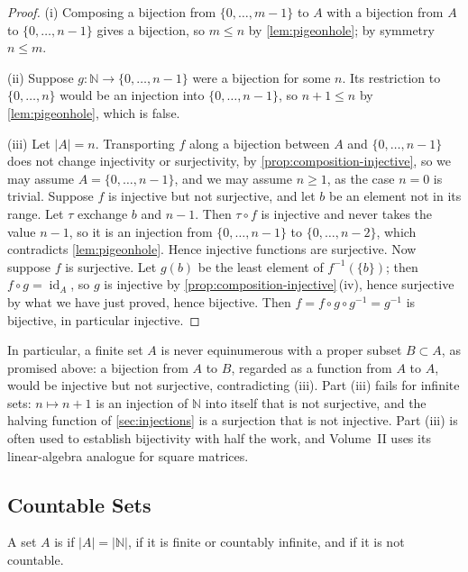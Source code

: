 \begin{proof}
(i) Composing a bijection from $\{0,\ldots,m-1\}$ to $A$ with a bijection from $A$ to $\{0,\ldots,n-1\}$ gives a bijection, so $m\le n$ by \cref{lem:pigeonhole}; by symmetry $n\le m$.

(ii) Suppose $g\colon\mathbb N\to\{0,\ldots,n-1\}$ were a bijection for some $n$. Its restriction to $\{0,\ldots,n\}$ would be an injection into $\{0,\ldots,n-1\}$, so $n+1\le n$ by \cref{lem:pigeonhole}, which is false.

(iii) Let $|A|=n$. Transporting $f$ along a bijection between $A$ and $\{0,\ldots,n-1\}$ does not change injectivity or surjectivity, by \cref{prop:composition-injective}, so we may assume $A=\{0,\ldots,n-1\}$, and we may assume $n\ge1$, as the case $n=0$ is trivial. Suppose $f$ is injective but not surjective, and let $b$ be an element not in its range. Let $\tau$ exchange $b$ and $n-1$. Then $\tau\circ f$ is injective and never takes the value $n-1$, so it is an injection from $\{0,\ldots,n-1\}$ to $\{0,\ldots,n-2\}$, which contradicts \cref{lem:pigeonhole}. Hence injective functions are surjective. Now suppose $f$ is surjective. Let $g(b)$ be the least element of $f^{-1}(\{b\})$; then $f\circ g=\operatorname{id}_A$, so $g$ is injective by \cref{prop:composition-injective}\,(iv), hence surjective by what we have just proved, hence bijective. Then $f=f\circ g\circ g^{-1}=g^{-1}$ is bijective, in particular injective.
\end{proof}

In particular, a finite set $A$ is never equinumerous with a proper subset $B\subset A$, as promised above: a bijection from $A$ to $B$, regarded as a function from $A$ to $A$, would be injective but not surjective, contradicting (iii). Part (iii) fails for infinite sets: $n\mapsto n+1$ is an injection of $\mathbb N$ into itself that is not surjective, and the halving function of \cref{sec:injections} is a surjection that is not injective. Part (iii) is often used to establish bijectivity with half the work, and Volume~II uses its linear-algebra analogue for square matrices.

\subsection{Countable Sets}

\begin{definition}
\label{def:countable}
A set $A$ is  if $|A|=|\mathbb N|$,  if it is finite or countably infinite, and  if it is not countable.
\end{definition}

